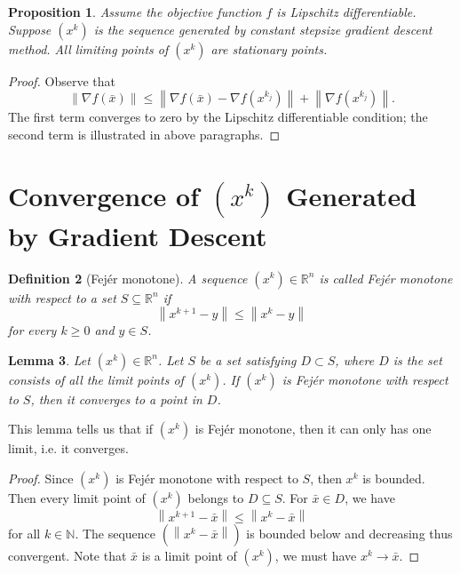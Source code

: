 \documentclass[12pt,a4paper]{report}
\numberwithin{equation}{section}
\theoremstyle{mystyle}
\newtheorem{definition}{Definition}[section]
\newtheorem{lemma}[definition]{Lemma}
\newtheorem{proposition}[definition]{Proposition}
\newcommand{\R}{\mathbb{R}}
\newcommand{\N}{\mathbb{N}}
\newcommand{\grad}{\nabla}
\newcommand{\norm}[1]{\left\lVert #1 \right\rVert}
\begin{document}
	\begin{proposition}
		Assume the objective function $f$ is Lipschitz differentiable. Suppose $(x^k)$ is the sequence generated by constant stepsize gradient descent method. All limiting points of $(x^k)$ are stationary points.
	\end{proposition}
	\begin{proof}
		Observe that
		$$
		\norm{\grad f(\bar{x})}\leq \norm{\grad f(\bar{x})-\grad f(x^{k_j})}+\norm{\grad f(x^{k_j})}.
		$$
		The first term converges to zero by the Lipschitz differentiable condition; the second term is illustrated in above paragraphs.
	\end{proof}


	\section{Convergence of $(x^k)$ Generated by Gradient Descent}
	\begin{definition}[Fej\'{e}r monotone]
		A sequence $(x^k)\in \R^n$ is called \emph{Fej\'{e}r monotone} with respect to a set $S\subseteq \R^n$ if 
		$$
		\norm{x^{k+1}-y}\leq \norm{x^k-y}
		$$
		for every $k\geq 0$ and $y\in S$.
	\end{definition}
	
	\begin{lemma}
		Let $(x^k)\in \R^n$. Let $S$  be a set satisfying $D\subset S$, where $D$ is the set consists of all the limit points of $(x^k)$. If $(x^k)$ is Fej\'{e}r monotone with respect to $S$, then it converges to a point in $D$.
	\end{lemma}
	This lemma tells us that if $(x^k)$ is Fej\'{e}r monotone, then it can only has one limit, i.e. it converges.
	\begin{proof}
		Since $(x^k)$ is Fej\'{e}r monotone with respect to $S$, then $x^k$ is bounded. Then every limit point of $(x^k)$ belongs to $D\subseteq S$. For $\bar{x}\in D$, we have
		$$
		\norm{x^{k+1}-\bar{x}}\leq \norm{x^k-\bar{x}}
		$$
		for all $k\in \N$. The sequence $(\norm{x^k-\bar{x}})$ is bounded below and decreasing thus convergent. Note that $\bar{x}$ is a limit point of $(x^k)$, we must have $x^k\to \bar{x}$.
	\end{proof}
	
\end{document}
